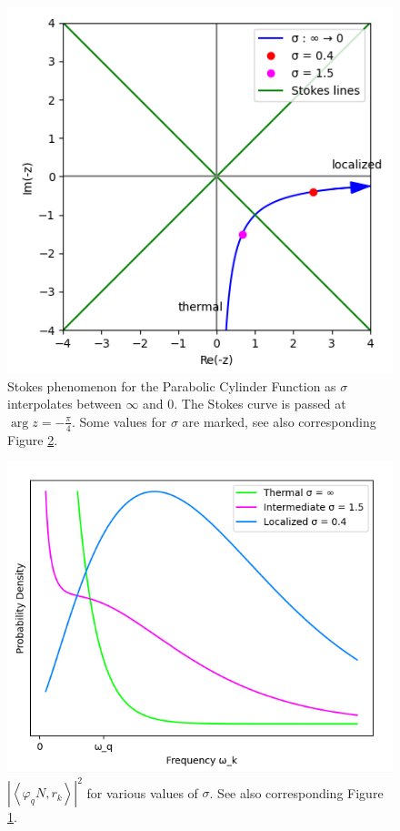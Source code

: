 \documentclass[12pt,a4paper]{article}
\begin{document}
\begin{figure}[h]
\centering
\includegraphics[scale=0.5]{stokes.png}
\caption{Stokes phenomenon for the Parabolic Cylinder Function as $\sigma$ interpolates between $\infty$ and $0$.  The Stokes curve is passed at $\arg z = -\frac{\pi}{4}$. Some values for $\sigma$ are marked, see also corresponding Figure \ref{pcf_sigma_curves}.}
\label{stokes}
\end{figure}

\begin{figure}
\centering
\includegraphics[scale=0.5]{pcf.png}
\caption{$\left|\left< \varphi_q N, r_k \right>\right|^2$ for various values of $\sigma$. See also corresponding Figure \ref{stokes}.}
\label{pcf_sigma_curves}
\end{figure}
\end{document}
